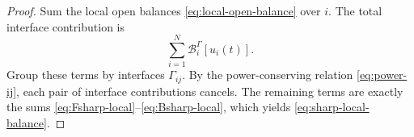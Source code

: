\documentclass[10pt,a4paper]{amsart}
\newcommand{\Bnd}{\mathcal{B}}
\begin{document}
\begin{proof}
Sum the local open balances \eqref{eq:local-open-balance} over \(i\). The total
interface contribution is
\[
\sum_{i=1}^N \Bnd_i^{\Gamma}[u_i(t)].
\]
Group these terms by interfaces \(\Gamma_{ij}\). By the power-conserving relation
\eqref{eq:power-ij}, each pair of interface contributions cancels. The remaining
terms are exactly the sums \eqref{eq:Fsharp-local}--\eqref{eq:Bsharp-local}, which
yields \eqref{eq:sharp-local-balance}.
\end{proof}
\end{document}
